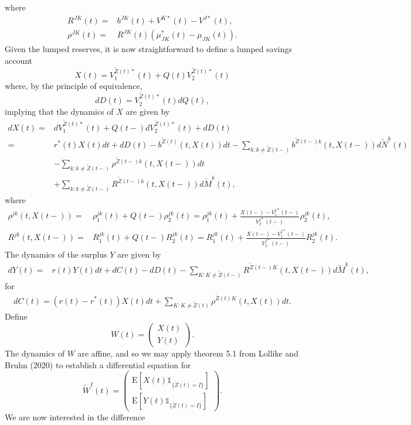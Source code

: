 \documentclass[12pt]{article}
\newcommand{\E}{\text{E}}
\newcommand{\indic}[1]{\mathds{1}_{ \{ #1 \} }}
\theoremstyle{my_thm}
\begin{document}
where
\begin{align*}
R^{JK}(t)=&b^{JK}(t)+V^{K*}(t)-V^{J*}(t),
\\
\rho^{JK}(t)=&R^{JK}(t)(\mu^*_{JK}(t)-\mu_{JK}(t)).
\end{align*}
Given the lumped reserves, it is now straightforward to define a lumped savings account
$$
X(t)=V^{\tilde{Z}(t)*}_1(t)+ Q(t)  V^{\tilde{Z}(t)*}_2(t)
$$
where, by the principle of equivalence,
$$
dD(t)= V_2^{\tilde{Z}(t)*}(t)dQ(t),
$$
implying that the dynamics of $X$ are given by
\begin{align*}
dX(t)=&dV^{\tilde{Z}(t)*}_1(t)+ Q(t-) dV^{\tilde{Z}(t)*}_2(t)+ dD(t)
\\
=&
r^*(t)X(t)dt
 +dD(t)
 -b^{\tilde{Z}(t)}(t,X(t)) dt
- \sum_{k:k \neq \tilde{Z}(t-)} b^{\tilde{Z}(t-)k}(t,X(t-)) d\tilde{N}^k(t)
\nonumber \\
&- \sum_{k:k \neq \tilde{Z}(t-)} \rho^{\tilde{Z}(t-)k}(t,X(t-))dt
\nonumber \\
&+ \sum_{k:k \neq \tilde{Z}(t-)}  R^{\tilde{Z}(t-)k}(t,X(t-))d\tilde{M}^k(t),\label{eq:AAB}
\end{align*}
where
\begin{align*}
\rho^{jk}(t,X(t-))=&\rho_1^{jk}(t)+Q(t-)\rho_2^{jk}(t)=\rho_1^{jk}(t)+\frac{X(t-)-V_1^{j*}(t-)}{V_2^{j*}(t-)}\rho_2^{jk}(t),
\\
R^{jk}(t,X(t-))=&R_1^{jk}(t)+Q(t-)R_2^{jk}(t)=R_1^{jk}(t)+\frac{X(t-)-V_1^{j*}(t-)}{V_2^{j*}(t-)}R_2^{jk}(t).
\end{align*}
The dynamics of the surplus $Y$ are given by
\begin{align*}
dY(t)=& r(t) Y(t) dt + dC(t)-dD(t)-
\sum_{K:K \neq \tilde{Z}(t-)}  R^{\tilde{Z}(t-)K}(t,X(t-)) d\tilde{M}^k(t), 
\end{align*}
for 
\begin{gather*}
dC(t)=(r(t)-r^*(t))X(t)dt+\sum_{K:K\neq \tilde{Z}(t)} \rho^{\tilde{Z}(t)K}(t,X(t)) dt.
\end{gather*}
Define
$$
W(t)=\begin{pmatrix}
X(t)\\
Y(t)
\end{pmatrix}.
$$
The dynamics of $W$ are affine, and so we may apply theorem 5.1 from Lollike and Bruhn (2020) to establish a differential equation for 
$$
\tilde{W}^I(t)= \begin{pmatrix}
\E[X(t)\indic{\tilde{Z}(t)=I}]\\
\E[Y(t)\indic{\tilde{Z}(t)=I}]
\end{pmatrix}.
$$
We are now interested in the difference
\end{document}
